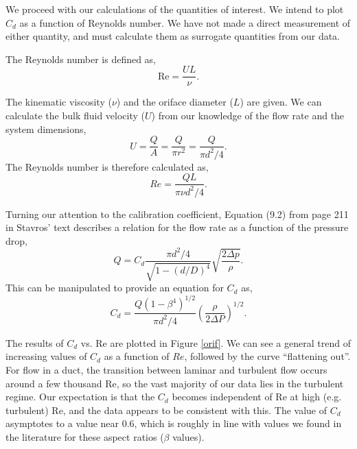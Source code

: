 \documentclass{article}
\begin{document}
We proceed with our calculations of the quantities of interest. We
intend to plot $C_d$ as a function of Reynolds number. We have not made
a direct measurement of either quantity, and must calculate them as
surrogate quantities from our data. 

The Reynolds number is defined as, 
\begin{equation}
 \text{Re} = \frac{UL}{\nu}.
\end{equation}

The kinematic viscosity ($\nu$) and the oriface diameter ($L$) are
given. We can calculate the bulk fluid velocity ($U$) from our knowledge
of the flow rate and the system dimensions, 
\begin{equation}
 U = \frac{Q}{A} = \frac{Q}{\pi r^2} = \frac{Q}{\pi d^2/4}.
\end{equation}
The Reynolds number is therefore calculated as,
\begin{equation}
 Re = \frac{Q L}{\pi \nu d^2/4}.
\end{equation}

Turning our attention to the calibration coefficient, Equation (9.2)
from page 211 in Stavros' text describes a relation for  
the flow rate as a function of the pressure drop,  
\begin{equation*}
 Q = C_d \frac{\pi d^2 / 4}{\sqrt{1-(d/D)^4}}\sqrt{\frac{2 \Delta p}{\rho}}.
\end{equation*}
This can be manipulated to provide an equation for $C_d$ as, 
\begin{equation}
 C_d = \frac{Q (1-\beta^4)^{1/2}}{\pi d^2/4} \left(\frac{\rho}{2 \Delta
					      P}\right)^{1/2}.
\end{equation}

The results of $C_d$ vs. Re are plotted in Figure \ref{orif}. We can see a general trend of increasing 
values of $C_d$ as a function of $Re$, followed by the curve ``flattening out''. For flow in a duct, 
the transition between laminar and turbulent flow occurs around a few thousand Re, so the vast majority 
of our data lies in the turbulent regime. Our expectation is that the $C_d$ becomes independent of Re at high 
(e.g. turbulent) Re, and the data appears to be consistent with this. The value of $C_d$ asymptotes to a value near 0.6, which is roughly in line with values we found in the literature for these aspect ratios ($\beta$ values).
\end{document}
